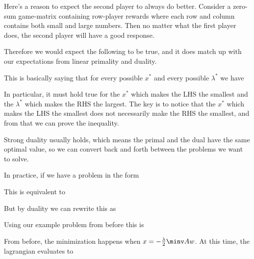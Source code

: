 \documentclass[12pt]{article}
\begin{document}
Here's a reason to expect the second player to always do better. Consider a zero-sum game-matrix containing row-player rewards  where each row and column contains both small and large numbers. Then no matter what the first player does, the second player will have a good response.

Therefore we would expect the following to be true, and it does match up with our expectations from linear primality and duality.


This is basically saying that for every possible $x^*$ and every possible $\lambda^*$ we have


In particular, it must hold true for the $x^*$ which makes the LHS the smallest and the $\lambda^*$ which makes the RHS the largest. The key is to notice that the $x^*$ which makes the LHS the smallest does not necessarily make the RHS the smallest, and from that we can prove the inequality.


Strong duality usually holds, which means the primal and the dual have the same optimal value, so we can convert back and forth between the problems we want to solve.

In practice, if we have a problem in the form


This is equivalent to

But by duality we can rewrite this as


Using our example problem from before this is


From before, the minimization happens when $x = -\frac{\lambda}{2} \minv A w$. At this time, the lagrangian evaluates to

\end{document}
